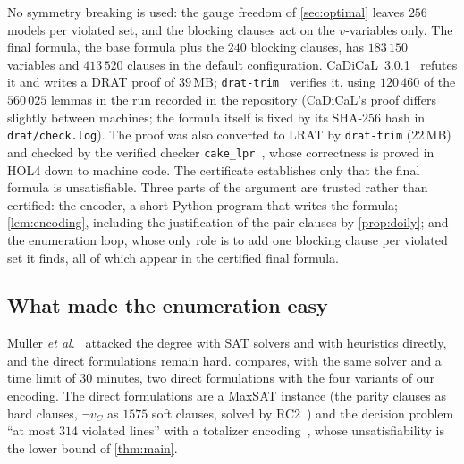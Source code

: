 \documentclass[11pt]{article}
\theoremstyle{definition}
\theoremstyle{remark}
\begin{document}
No symmetry breaking is used: the gauge freedom of \cref{sec:optimal} leaves $256$ models per violated set, and the blocking clauses act on the $v$-variables only.
The final formula, the base formula plus the $240$ blocking clauses, has $183\,150$ variables and $413\,520$ clauses in the default configuration.
CaDiCaL~3.0.1~\cite{CaDiCaL} refutes it and writes a DRAT proof of $39$\,MB; \texttt{drat-trim}~\cite{DRATtrim} verifies it, using $120\,460$ of the $560\,025$ lemmas in the run recorded in the repository (CaDiCaL's proof differs slightly between machines; the formula itself is fixed by its SHA-256 hash in \texttt{drat/check.log}).
The proof was also converted to LRAT by \texttt{drat-trim} ($22$\,MB) and checked by the verified checker \texttt{cake\_lpr}~\cite{cakeLPR}, whose correctness is proved in HOL4 down to machine code.
The certificate establishes only that the final formula is unsatisfiable. Three parts of the argument are trusted rather than certified: the encoder, a short Python program that writes the formula; \cref{lem:encoding}, including the justification of the pair clauses by \cref{prop:doily}; and the enumeration loop, whose only role is to add one blocking clause per violated set it finds, all of which appear in the certified final formula.

\subsection{What made the enumeration easy}\label{sec:ablation}
Muller \emph{et al.}~\cite{Muller23,Muller24} attacked the degree with SAT solvers and with heuristics directly, and the direct formulations remain hard.
 compares, with the same solver and a time limit of $30$ minutes, two direct formulations with the four variants of our encoding.
The direct formulations are a MaxSAT instance (the parity clauses as hard clauses, $\neg v_C$ as $1575$ soft clauses, solved by RC2~\cite{RC2}) and the decision problem ``at most $314$ violated lines'' with a totalizer encoding~\cite{Totalizer}, whose unsatisfiability is the lower bound of \cref{thm:main}.
\end{document}
